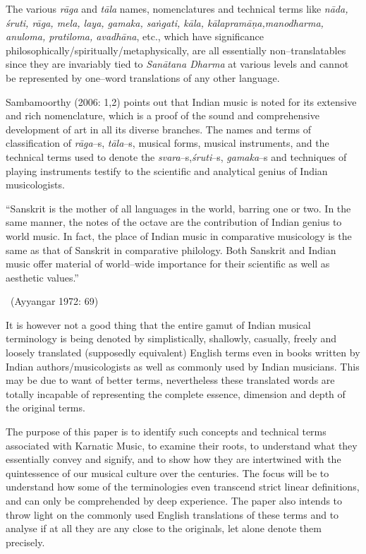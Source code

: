 The various \textit{rāga} and \textit{tāla} names, nomenclatures and technical terms like \textit{nāda, śruti, rāga, mela, laya, gamaka, saṅgati, kāla, kālapramāṇa,\break manodharma, anuloma, pratiloma, avadhāna}, etc., which have significance philosophically/spiritually/metaphysically, are all essentially non–\break translatables since they are invariably tied to \textit{Sanātana Dharma} at various levels and cannot be represented by one–word translations of any other language.

Sambamoorthy (2006: 1,2) points out that Indian music is noted for its extensive and rich nomenclature, which is a proof of the sound and comprehensive development of art in all its diverse branches. The names and terms of classification of \textit{rāga}–s, \textit{tāla}–s, musical forms, musical instruments, and the technical terms used to denote the \textit{svara}–s,\break \textit{śruti}–s, \textit{gamaka}–s and techniques of playing instruments testify to the scientific and analytical genius of Indian musicologists.

\begin{myquote}
“Sanskrit is the mother of all languages in the world, barring one or two. In the same manner, the notes of the octave are the contribution of Indian genius to world music. In fact, the place of Indian music in comparative musicology is the same as that of Sanskrit in comparative philology. Both Sanskrit and Indian music offer material of world–wide importance for their scientific as well as aesthetic values.” 

~\hfill (Ayyangar 1972: 69)
\end{myquote}

It is however not a good thing that the entire gamut of Indian musical terminology is being denoted by simplistically, shallowly, casually, freely and loosely translated (supposedly equivalent) English terms even in books written by Indian authors/musicologists as well as commonly used by Indian musicians. This may be due to want of better terms, nevertheless these translated words are totally incapable of representing the complete essence, dimension and depth of the original terms. 

The purpose of this paper is to identify such concepts and technical terms associated with Karnatic Music, to examine their roots, to understand what they essentially convey and signify, and to show how they are intertwined with the quintessence of our musical culture over the centuries. The focus will be to understand how some of the terminologies even transcend strict linear definitions, and can only be comprehended by deep experience. The paper also intends to throw light on the commonly used English translations of these terms and to analyse if at all they are any close to the originals, let alone denote them precisely.

